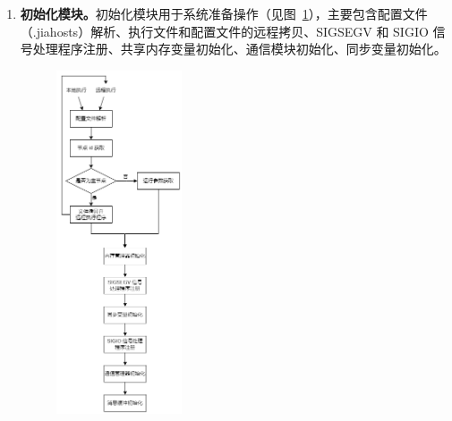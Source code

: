 {\begin{enumerate}[label=\arabic*.]
    \item \textbf{初始化模块。}初始化模块用于系统准备操作（见图~\ref{fig:JIAJIA-init}），主要包含配置文件（.jiahosts）解析、执行文件和配置文件的远程拷贝、SIGSEGV 和 SIGIO 信号处理程序注册、共享内存变量初始化、通信模块初始化、同步变量初始化。
    \begin{figure}[!htbp]
        \centering
        \includegraphics[width=0.35\textwidth]{Img/JIAJIA-init.png}
        \label{fig:JIAJIA-init}
    \end{figure}


\end{enumerate}}

